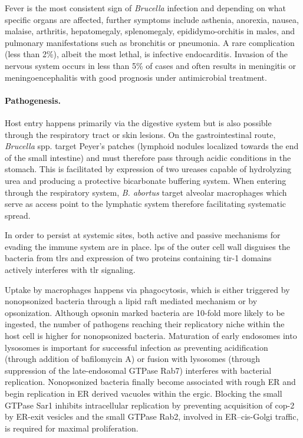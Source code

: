 Fever is the most consistent sign of \textit{Brucella} infection and depending on what specific organs are affected, further symptoms include asthenia, anorexia, nausea, malaise, arthritis, hepatomegaly, splenomegaly, epididymo-orchitis in males, and pulmonary manifestations such as bronchitis or pneumonia. A rare complication (less than 2\%), albeit the most lethal, is infective endocarditis. Invasion of the nervous system occurs in less than 5\% of cases and often results in meningitis or meningoencephalitis with good prognosis under antimicrobial treatment.

\paragraph{Pathogenesis.}
Host entry happens primarily via the digestive system but is also possible through the respiratory tract or skin lesions. On the gastrointestinal route, \textit{Brucella} spp. target Peyer's patches (lymphoid nodules localized towards the end of the small intestine) and must therefore pass through acidic conditions in the stomach. This is facilitated by expression of two ureases capable of hydrolyzing urea and producing a protective bicarbonate buffering system. When entering through the respiratory system, \textit{B. abortus} target alveolar macrophages which serve as access point to the lymphatic system therefore facilitating systematic spread.

In order to persist at systemic sites, both active and passive mechanisms for evading the immune system are in place. \Gls{lps} of the outer cell wall disguises the bacteria from \glspl{tlr} and expression of two proteins containing \gls{tir-1} domains actively interferes with \gls{tlr} signaling.

Uptake by macrophages happens via phagocytosis, which is either triggered by nonopsonized bacteria through a lipid raft mediated mechanism or by opsonization. Although opsonin marked bacteria are 10-fold more likely to be ingested, the number of pathogens reaching their replicatory niche within the host cell is higher for nonopsonized bacteria. Maturation of early endosomes into lysosomes is important for successful infection as preventing acidification (through addition of bafilomycin A) or fusion with lysosomes (through suppression of the late-endosomal GTPase Rab7) interferes with bacterial replication. Nonopsonized bacteria finally become associated with rough ER and begin replication in ER derived vacuoles within the \gls{ergic}. Blocking the small GTPase Sar1 inhibits intracellular replication by preventing acquisition of \gls{cop-2} by ER-exit vesicles and the small GTPase Rab2, involved in ER--cis-Golgi traffic, is required for maximal proliferation.

